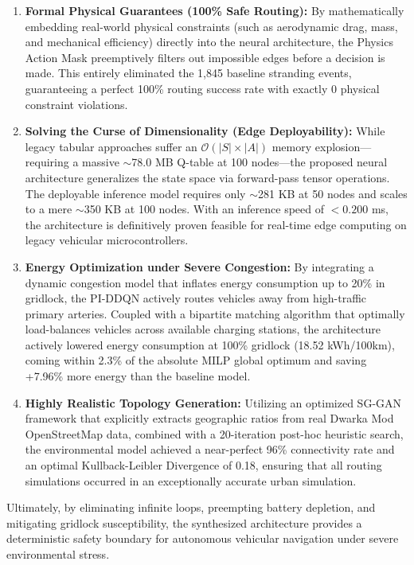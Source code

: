 \documentclass[journal, a4paper, twocolumn]{IEEEtran}
\begin{document}
\begin{enumerate}
    \item \textbf{Formal Physical Guarantees (100\% Safe Routing):} By mathematically embedding real-world physical constraints (such as aerodynamic drag, mass, and mechanical efficiency) directly into the neural architecture, the Physics Action Mask preemptively filters out impossible edges before a decision is made. This entirely eliminated the 1,845 baseline stranding events, guaranteeing a perfect 100\% routing success rate with exactly 0 physical constraint violations.
    \item \textbf{Solving the Curse of Dimensionality (Edge Deployability):} While legacy tabular approaches suffer an $\mathcal{O}(|S| \times |A|)$ memory explosion---requiring a massive $\sim$78.0 MB Q-table at 100 nodes---the proposed neural architecture generalizes the state space via forward-pass tensor operations. The deployable inference model requires only $\sim$281 KB at 50 nodes and scales to a mere $\sim$350 KB at 100 nodes. With an inference speed of $<0.200$ ms, the architecture is definitively proven feasible for real-time edge computing on legacy vehicular microcontrollers.
    \item \textbf{Energy Optimization under Severe Congestion:} By integrating a dynamic congestion model that inflates energy consumption up to 20\% in gridlock, the PI-DDQN actively routes vehicles away from high-traffic primary arteries. Coupled with a bipartite matching algorithm that optimally load-balances vehicles across available charging stations, the architecture actively lowered energy consumption at 100\% gridlock (18.52 kWh/100km), coming within 2.3\% of the absolute MILP global optimum and saving +7.96\% more energy than the baseline model.
    \item \textbf{Highly Realistic Topology Generation:} Utilizing an optimized SG-GAN framework that explicitly extracts geographic ratios from real Dwarka Mod OpenStreetMap data, combined with a 20-iteration post-hoc heuristic search, the environmental model achieved a near-perfect 96\% connectivity rate and an optimal Kullback-Leibler Divergence of 0.18, ensuring that all routing simulations occurred in an exceptionally accurate urban simulation.
\end{enumerate}

Ultimately, by eliminating infinite loops, preempting battery depletion, and mitigating gridlock susceptibility, the synthesized architecture provides a deterministic safety boundary for autonomous vehicular navigation under severe environmental stress.
\end{document}
